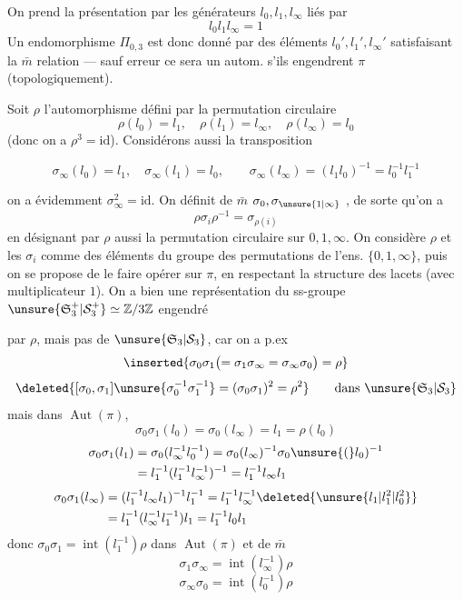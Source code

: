 On prend la présentation par les générateurs $l_0,l_1,l_\infty$ liés par
\[
l_0l_1l_\infty=1
\]
Un endomorphisme  $\Pi_{0,3}$ est donc donné par des éléments $l_0',l_1',l_\infty'$ satisfaisant la $\bar m$ relation --- sauf erreur ce sera un autom. s'ils engendrent $\pi$ (topologiquement).

Soit $\rho$ l'automorphisme défini par la permutation circulaire
\[
\rho(l_0)=l_1,\quad\rho(l_1)=l_\infty,\quad\rho(l_\infty)=l_0
\]
(donc on a $\rho^3=\mathrm{id}$). Considérons aussi la transposition

\[
\sigma_\infty(l_0)=l_1,\quad\sigma_\infty(l_1)=l_0,\qquad
\sigma_\infty(l_\infty)=(l_1l_0)^{-1}=l_0^{-1}l_1^{-1}
\]

on a évidemment $\sigma_\infty^2=\mathrm{id}$. On définit de $\bar m$ $\sigma_0,\sigma_{\unsure{1|\infty}}$ , de sorte qu'on a
\[
\rho\sigma_i\rho^{-1}=\sigma_{\rho(i)}
\]
en désignant par $\rho$ aussi la permutation circulaire sur $0,1,\infty$. On considère $\rho$ et les $\sigma_i$ comme des éléments du groupe  des permutations de l'ens. $\{0,1,\infty\}$, puis on se propose de le faire opérer sur $\pi$, en respectant la structure des lacets (avec  multiplicateur $1$). On a bien une  représentation du ss-groupe $\unsure{\mathfrak S_3^+|\mathcal S_3^+}\simeq\mathbb Z/3\mathbb Z$ engendré

par $\rho$, mais pas de $\unsure{\mathfrak S_3|\mathcal S_3}$, car on a p.ex
\[
\inserted{\sigma_0\sigma_1\bigl(=\sigma_1\sigma_\infty=\sigma_\infty\sigma_0\bigr)=\rho}
\]
\[
\deleted{[\sigma_0,\sigma_1]\unsure{\sigma_0^{-1}\sigma_1^{-1}}=(\sigma_0\sigma_1)^2=\rho^2}\qquad\text{dans }\unsure{\mathfrak S_3|\mathcal S_3}
\]
mais dans $\operatorname{Aut}(\pi)$, 
\[
\sigma_0\sigma_1(l_0)=\sigma_0(l_\infty)=l_1=\rho(l_0)
\]
\[
\begin{aligned}
\sigma_0\sigma_1(l_1)&=\sigma_0(l_\infty^{-1}l_0^{-1})=\sigma_0(l_\infty)^{-1}\sigma_0\unsure{(}l_0)^{-1}\\
&=l_1^{-1}(l_1^{-1}l_\infty^{-1})^{-1}=l_1^{-1}l_\infty l_1
\end{aligned}
\]
\[
\begin{aligned}
\sigma_0\sigma_1(l_\infty)&=(l_1^{-1}l_\infty l_1)^{-1}l_1^{-1}=l_1^{-1}l_\infty^{-1}\deleted{\unsure{l_1|l_1^2|l_0^2}}\\
&=l_1^{-1}(l_\infty^{-1}l_1^{-1})l_1=l_1^{-1}l_0l_1
\end{aligned}
\]
donc $\sigma_0\sigma_1=\operatorname{int}(l_1^{-1})\rho$ dans $\operatorname{Aut}(\pi)$
et de $\bar m$
\[
\sigma_1\sigma_\infty=\operatorname{int}(l_\infty^{-1})\rho
\]
\[
\sigma_\infty\sigma_0=\operatorname{int}(l_0^{-1})\rho
\]

